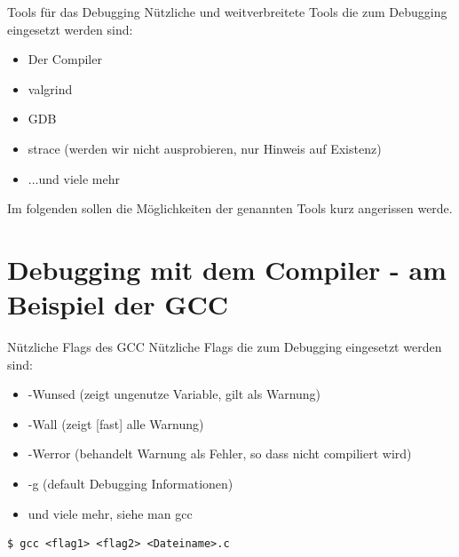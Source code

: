
\begin{frame}{Tools für das Debugging}
	Nützliche und weitverbreitete Tools die zum Debugging eingesetzt werden sind:
	\begin{itemize}
		\item Der Compiler
		\item valgrind
		\item GDB
		\item strace (werden wir nicht ausprobieren, nur Hinweis auf Existenz)
		\item ...und viele mehr
	\end{itemize}
	Im folgenden sollen die Möglichkeiten der genannten Tools kurz angerissen werde.
\end{frame}

\section{Debugging mit dem Compiler - am Beispiel der GCC}


\begin{frame}[fragile]{N\"utzliche Flags des GCC}
	Nützliche Flags die zum Debugging eingesetzt werden sind:
	\begin{itemize}
		\item -Wunsed (zeigt ungenutze Variable, gilt als Warnung)
		\item -Wall (zeigt [fast] alle Warnung)
		\item -Werror (behandelt Warnung als Fehler, so dass nicht compiliert wird)
		\item -g (default Debugging Informationen) 
		\item und viele mehr, siehe man gcc
	\end{itemize}
			\begin{lstlisting}[numbers=none]
$ gcc <flag1> <flag2> <Dateiname>.c\end{lstlisting}
\end{frame}

